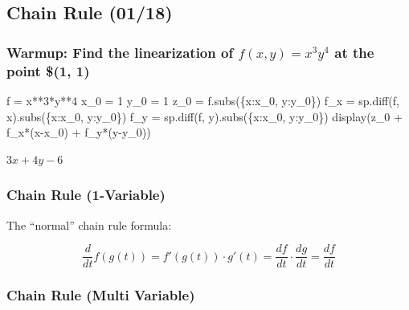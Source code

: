 \documentclass[
  letterpaper,
  DIV=11,
  numbers=noendperiod]{scrartcl}
\newenvironment{Shaded}{\begin{snugshade}}{\end{snugshade}}
\newcommand{\DecValTok}[1]{\textcolor[rgb]{0.68,0.00,0.00}{#1}}
\newcommand{\NormalTok}[1]{\textcolor[rgb]{0.00,0.23,0.31}{#1}}
\newcommand{\OperatorTok}[1]{\textcolor[rgb]{0.37,0.37,0.37}{#1}}
\begin{document}
\hypertarget{chain-rule-0118}{%
\subsection{Chain Rule (01/18)}\label{chain-rule-0118}}

\hypertarget{warmup-find-the-linearization-of-fx-y-x3y4-at-the-point-1-1}{%
\subsubsection{\texorpdfstring{Warmup: Find the linearization of
\(f(x, y) = x^3y^4\) at the point \$(1,
1)}{Warmup: Find the linearization of f(x, y) = x\^{}3y\^{}4 at the point \$(1, 1)}}\label{warmup-find-the-linearization-of-fx-y-x3y4-at-the-point-1-1}}

\begin{Shaded}
\begin{Highlighting}[numbers=left,,]
\NormalTok{f }\OperatorTok{=}\NormalTok{ x}\OperatorTok{**}\DecValTok{3}\OperatorTok{*}\NormalTok{y}\OperatorTok{**}\DecValTok{4}
\NormalTok{x\_0 }\OperatorTok{=} \DecValTok{1}
\NormalTok{y\_0 }\OperatorTok{=} \DecValTok{1}
\NormalTok{z\_0 }\OperatorTok{=}\NormalTok{ f.subs(\{x:x\_0, y:y\_0\})}
\NormalTok{f\_x }\OperatorTok{=}\NormalTok{ sp.diff(f, x).subs(\{x:x\_0, y:y\_0\})}
\NormalTok{f\_y }\OperatorTok{=}\NormalTok{ sp.diff(f, y).subs(\{x:x\_0, y:y\_0\})}
\NormalTok{display(z\_0 }\OperatorTok{+}\NormalTok{ f\_x}\OperatorTok{*}\NormalTok{(x}\OperatorTok{{-}}\NormalTok{x\_0) }\OperatorTok{+}\NormalTok{ f\_y}\OperatorTok{*}\NormalTok{(y}\OperatorTok{{-}}\NormalTok{y\_0))}
\end{Highlighting}
\end{Shaded}

$\displaystyle 3 x + 4 y - 6$

\hypertarget{chain-rule-1-variable}{%
\subsubsection{Chain Rule (1-Variable)}\label{chain-rule-1-variable}}

The ``normal'' chain rule formula:

\[
\frac{d}{dt}f(g(t))=f'(g(t))\cdot g'(t)
 = \frac{df}{dt}\cdot \frac{dg}{dt} = \frac{df}{dt}
\]

\hypertarget{chain-rule-multi-variable}{%
\subsubsection{Chain Rule (Multi
Variable)}\label{chain-rule-multi-variable}}
\end{document}
